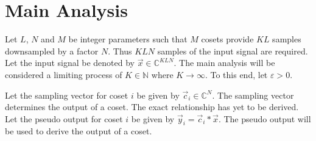 \documentclass[a4paper, openany, oneside]{memoir}
\begin{document}
\section{Main Analysis}
Let $L$, $N$ and $M$ be integer parameters such that $M$ cosets provide $KL$ samples downsampled by a factor $N$. Thus $KLN$ samples of the input signal are required. Let the input signal be denoted by $\vec{x} \in \mathbb{C}^{KLN}$. The main analysis will be considered a limiting process of $K \in \mathbb{N}$ where $K \to \infty$. To this end, let $\varepsilon > 0$.

Let the sampling vector for coset $i$ be given by $\vec{c}_i \in \mathbb{C}^{N}$. The sampling vector determines the output of a coset. The exact relationship has yet to be derived. Let the pseudo output for coset $i$ be given by $\vec{y}_i = \vec{c}_i \ast \vec{x}$. The pseudo output will be used to derive the output of a coset.

\begin{blockTheorem} \label{th:conv-corr}
     \nolinebreak
\end{blockTheorem}
\end{document}
